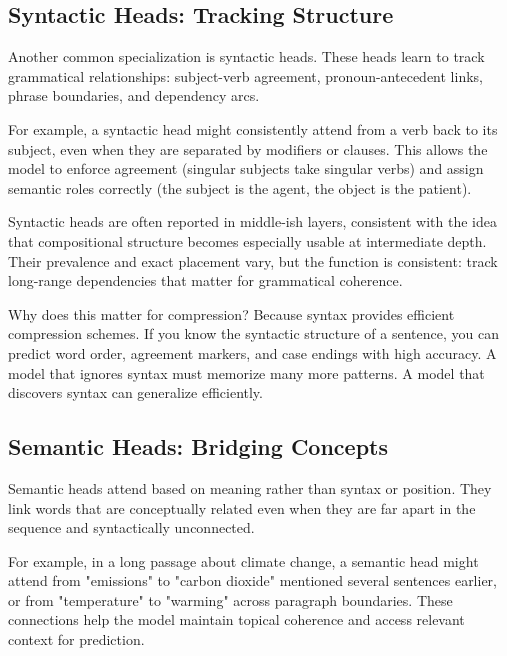\vspace{1.5em}


\vspace{1.5em}

\subsection{Syntactic Heads: Tracking Structure}

Another common specialization is syntactic heads. These heads learn to track grammatical relationships: subject-verb agreement, pronoun-antecedent links, phrase boundaries, and dependency arcs.

For example, a syntactic head might consistently attend from a verb back to its subject, even when they are separated by modifiers or clauses. This allows the model to enforce agreement (singular subjects take singular verbs) and assign semantic roles correctly (the subject is the agent, the object is the patient).

Syntactic heads are often reported in middle-ish layers, consistent with the idea that compositional structure becomes especially usable at intermediate depth. Their prevalence and exact placement vary, but the function is consistent: track long-range dependencies that matter for grammatical coherence.

\vspace{1em}

Why does this matter for compression? Because syntax provides efficient compression schemes. If you know the syntactic structure of a sentence, you can predict word order, agreement markers, and case endings with high accuracy. A model that ignores syntax must memorize many more patterns. A model that discovers syntax can generalize efficiently.

\vspace{1.5em}


\vspace{1.5em}

\subsection{Semantic Heads: Bridging Concepts}

Semantic heads attend based on meaning rather than syntax or position. They link words that are conceptually related even when they are far apart in the sequence and syntactically unconnected.

For example, in a long passage about climate change, a semantic head might attend from "emissions" to "carbon dioxide" mentioned several sentences earlier, or from "temperature" to "warming" across paragraph boundaries. These connections help the model maintain topical coherence and access relevant context for prediction.

